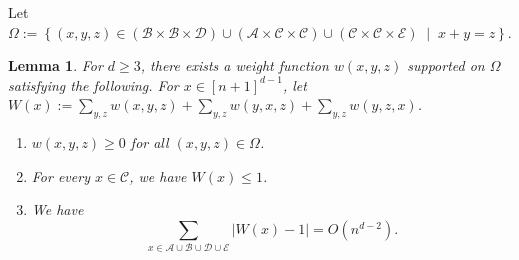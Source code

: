 \documentclass{article}
\newcommand{\setcond}[2]{\left\{ #1 \;\middle\vert\; #2 \right\}}
\newcommand{\cA}{\mathcal{A}}
\newcommand{\cB}{\mathcal{B}}
\newcommand{\cC}{\mathcal{C}}
\newcommand{\cD}{\mathcal{D}}
\newcommand{\cE}{\mathcal{E}}
\newtheorem{lem}[thm]{Lemma}
\theoremstyle{definition}
\begin{document}
Let $\Omega:=\setcond{(x,y,z)\in (\cB\times \cB\times \cD)\cup (\cA\times \cC\times \cC)\cup (\cC\times \cC\times \cE)}{x+y=z}$.
\begin{lem} \label{lem:weight}
    For $d\geq 3$, there exists a weight function $w(x,y,z)$ supported on $\Omega$ satisfying the following. For $x\in [n+1]^{d-1}$, let $W(x) := \sum_{y,z} w(x,y,z) + \sum_{y,z} w(y,x,z) + \sum_{y,z} w(y,z,x)$.
    \begin{enumerate}
        \item $w(x,y,z)\geq 0$ for all $(x,y,z)\in \Omega$.
        \item For every $x\in \cC$, we have $W(x)\leq 1$.
        \item We have
        \[\sum_{x\in \cA\cup \cB\cup \cD\cup \cE} |W(x)-1| = O(n^{d-2}).\]
    \end{enumerate}
\end{lem}
\end{document}

